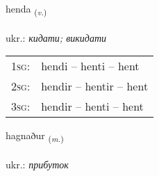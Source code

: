 \documentclass[frontgrid, backgrid]{flacards}\usepackage[]{graphicx}\usepackage[]{xcolor}
\begin{document}
\renewcommand{\flhead}{\vskip5pt \fboxsep=0pt {\small\bfseries\footnotesize Sagnorð | дієслово}}
\renewcommand{\fcfoot}{\vskip5pt \fboxsep=0pt \hspace{2pt}{\small\bfseries\footnotesize 2K}}

\renewcommand{\blhead}{\vskip5pt {\small\bfseries\footnotesize Sagnorð | дієслово }}
\renewcommand{\bcfoot}{\vskip5pt \hspace{2pt}{\small\bfseries\footnotesize 2K}}


{henda \small{\textsubscript{(\textit{v.})}} \\[1ex] %
\textphonetic{[hɛnta]} \\
ukr.: \emph{кидати; викидати} \\  [2ex]
\renewcommand*{\arraystretch}{0.8}
\begin{tabular}{p{1cm}l}
\textsc{1sg}: & hendi -- henti -- hent \\ 
\textsc{2sg}: & hendir -- hentir -- hent \\ 
\textsc{3sg}: & hendir -- henti -- hent \\ 
\end{tabular}
}

\renewcommand{\flhead}{\vskip5pt \fboxsep=0pt {\small\bfseries\footnotesize Nafnorð | іменник}}
\renewcommand{\fcfoot}{\vskip5pt \fboxsep=0pt \hspace{2pt}{\small\bfseries\footnotesize 2K}}

\renewcommand{\blhead}{\vskip5pt {\small\bfseries\footnotesize Nafnorð | іменник }}
\renewcommand{\bcfoot}{\vskip5pt \hspace{2pt}{\small\bfseries\footnotesize 2K}}


{hagnaður \small{\textsubscript{(\textit{m.})}} \\[1ex] %
\textphonetic{[haknaðʏr]} \\
ukr.: \emph{прибуток} \\  [2ex]
\renewcommand*{\arraystretch}{0.8}
}
\end{document}
